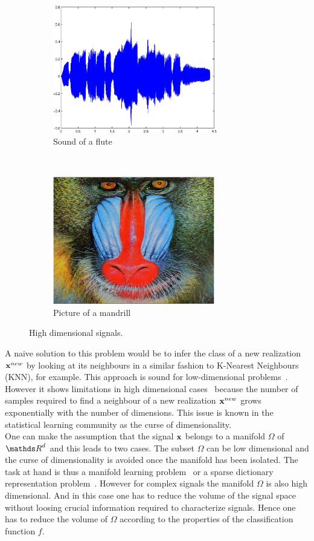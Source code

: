 \documentclass[a4paper,11pt]{report}
\begin{document}
		\begin{figure}[h]
			\centering
			\begin{subfigure}[t]{0.48\textwidth}
				\centering
				\includegraphics[height=2.2in]{waveform_flute.eps}
				\caption{Sound of a flute}
			\end{subfigure}%
			~ 
			\begin{subfigure}[t]{0.48\textwidth}
        \centering
        \includegraphics[height=2.2in]{im_mandrill.eps}
        \caption{Picture of a mandrill}
			\end{subfigure}
			\caption{High dimensional signals.}
			\label{fig:highDim signals}
		\end{figure}
		
		A naive solution to this problem would be to infer the class of a new realization ${\bf x}^{new}$ by looking at its neighbours in a similar fashion to K-Nearest Neighbours (KNN), for example. This approach is sound for low-dimensional problems~\citep{cover1967nearest}. However it shows limitations in high dimensional cases~\citep{beyer1999nearest} because the number of samples required to find a neighbour of a new realization ${\bf x}^{new}$ grows exponentially with the number of dimensions. This issue is known in the statistical learning community as the curse of dimensionality.\\
			
		One can make the assumption that the signal ${\bf x}$ belongs to a manifold $\Omega$ of $\dsR^{d}$ and this leads to two cases. The subset $\Omega$ can be low dimensional and the curse of dimensionality is avoided once the manifold has been isolated. The task at hand is thus a manifold learning problem~\citep{lin2008riemannian} \citep{zhang2012adaptive} or a sparse dictionary representation problem~\citep{kreutz2003dictionary}. However for complex signals the manifold $\Omega$ is also high dimensional. And in this case one has to reduce the volume of the signal space without loosing crucial information required to characterize signals. Hence one has to reduce the volume of $\Omega$ according to the properties of the classification function $f$.\\
		
\end{document}
